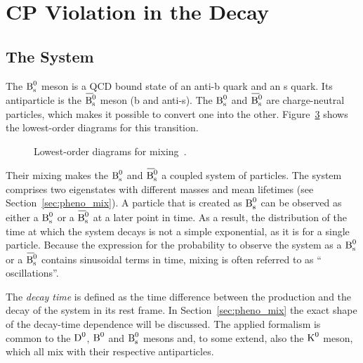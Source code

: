 \section{CP Violation in the \texorpdfstring{\BstoJpsiphi{}}{Bs0->Jpsiphi} Decay}
\label{sec:intro_Jpsiphi}

\subsection{The \texorpdfstring{\BsBsbar{}}{Bs0-Bs0bar} System}
\label{subsec:intro_Jpsiphi_Bs}

The $\text{B}_\text{s}^\text{0}$ meson is a QCD bound state of an anti-b quark and an s quark. Its antiparticle is the $\Bsbar$ meson (b and anti-s). The $\text{B}_\text{s}^\text{0}$
and $\Bsbar$ are charge-neutral particles, which makes it possible to convert one into the other. Figure~\ref{fig:mixing} shows the
lowest-order diagrams for this transition.
\begin{figure}[hbt]
  \centering
  \begin{subfigure}{0.5\textwidth}
    \centering
    {\sffamily }
    \caption{}
    \label{fig:mixing_1}
  \end{subfigure}%
  \begin{subfigure}{0.5\textwidth}
    \centering
    {\sffamily }
    \caption{}
    \label{fig:mixing_2}
  \end{subfigure}
  \caption{Lowest-order diagrams for \BsBsbar{} mixing~\cite{LHCb-PAPER-2013-002}.}
  \label{fig:mixing}
\end{figure}

Their mixing makes the $\text{B}_\text{s}^\text{0}$ and $\Bsbar$ a coupled system of particles. The system comprises two eigenstates with different masses and
mean lifetimes (see Section~\ref{sec:pheno_mix}). A particle that is created as $\text{B}_\text{s}^\text{0}$ can be observed as either a $\text{B}_\text{s}^\text{0}$ or a $\Bsbar$ at a
later point in time. As a result, the distribution of the time at which the \BsBsbar{} system decays is not a simple exponential, as it is
for a single particle. Because the expression for the probability to observe the system as a $\text{B}_\text{s}^\text{0}$ or a $\Bsbar$ contains sinusoidal
terms in time, mixing is often referred to as ``\BsBsbar{} oscillations''.

The \emph{decay time} is defined as the time difference between the production and the decay of the \BsBsbar{} system in its rest frame. In
Section~\ref{sec:pheno_mix} the exact shape of the decay-time dependence will be discussed. The applied formalism is common to the $\text{D}^\text{0}$,
$\text{B}^\text{0}$ and $\text{B}_\text{s}^\text{0}$ mesons and, to some extend, also the $\text{K}^\text{0}$ meson, which all mix with their respective antiparticles.

